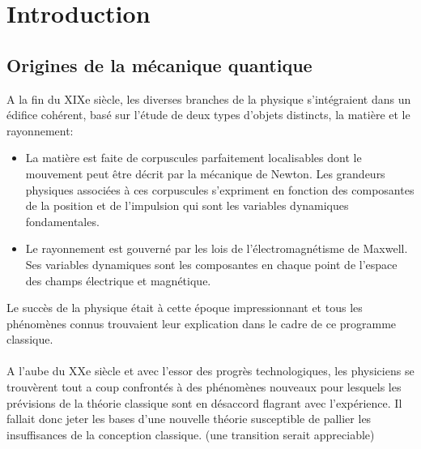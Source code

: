\chapter*{Introduction}

\section*{Origines de la mécanique quantique}
A la fin du XIXe siècle, les diverses branches de la physique s'intégraient dans un édifice cohérent, basé sur l'étude de deux types d’objets distincts, la matière et le rayonnement:
\begin{itemize}
	\item La matière est faite de corpuscules parfaitement localisables dont le mouvement peut être décrit par la mécanique de Newton. Les grandeurs physiques associées à ces corpuscules s’expriment en fonction des composantes de la position et de l’impulsion qui sont les variables dynamiques fondamentales.
	\item Le rayonnement est gouverné par les lois de l'électromagnétisme de Maxwell. Ses variables dynamiques sont les composantes en chaque point de l’espace des champs électrique et magnétique.
\end{itemize}
Le succès de la physique était à cette époque impressionnant et tous les phénomènes connus trouvaient leur explication dans le cadre de ce programme classique.\\\\
A l’aube du XXe siècle et avec l’essor des progrès technologiques, les physiciens se trouvèrent tout a coup confrontés à des phénomènes nouveaux pour lesquels les prévisions de la théorie classique sont en désaccord flagrant avec l'expérience. Il fallait donc jeter les bases d’une nouvelle théorie susceptible de pallier les insuffisances de la conception classique. (une transition serait appreciable)

